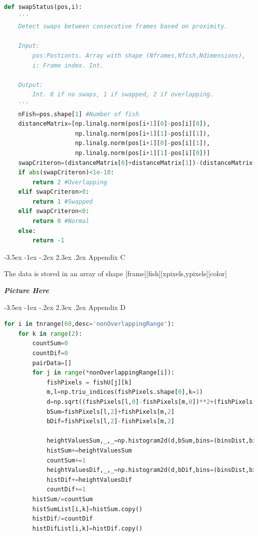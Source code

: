 \documentclass{article}
\makeatletter
\renewcommand\section{\clearpage\newpage\@startsection {section}{1}{\z@}%
	{-3.5ex \@plus -1ex \@minus -.2ex}%
	{2.3ex \@plus.2ex}%
	{\normalfont\Large\bfseries}}
\makeatother
\begin{document}
\begin{minipage}[c]{\textwidth}
\begin{lstlisting}[language=Python]
def swapStatus(pos,i):
    '''
    Detect swaps between consecutive frames based on proximity.
    
    Input:
        pos:Postionts. Array with shape (Nframes,Nfish,Ndimensions),
        i: Frame index. Int.
    
    Output:
        Int. 0 if no swaps, 1 if swapped, 2 if overlapping.
    '''
    nFish=pos.shape[1] #Number of fish
    distanceMatrix=[np.linalg.norm(pos[i+1][0]-pos[i][0]),
                    np.linalg.norm(pos[i+1][1]-pos[i][1]),
                    np.linalg.norm(pos[i+1][0]-pos[i][1]),
                    np.linalg.norm(pos[i+1][1]-pos[i][0])]
    swapCriteron=(distanceMatrix[0]+distanceMatrix[1])-(distanceMatrix[2]+distanceMatrix[3])
    if abs(swapCriteron)<1e-10:
        return 2 #Overlapping
    elif swapCriteron>0:
        return 1 #Swapped
    elif swapCriteron<0:
        return 0 #Normal
    else:
        return -1
\end{lstlisting}
\end{minipage}

\section{Appendix C}
\label{app:dataShape}

The data is stored in an array of shape [frame][fish][xpixels,ypixels][color]

\textit{\textbf{Picture Here}}

\section{Appendix D}
\label{app:histCreator}

\begin{minipage}[c]{\textwidth}
\begin{lstlisting}[language=Python]
for i in tnrange(60,desc='nonOverlappingRange'):
    for k in range(2):
        countSum=0
        countDif=0
        pairData=[]
        for j in range(*nonOverlappingRange[i]):
            fishPixels = fishU[j][k]
            m,l=np.triu_indices(fishPixels.shape[0],k=1)
            d=np.sqrt((fishPixels[l,0]-fishPixels[m,0])**2+(fishPixels[l,1]-fishPixels[m,1])**2)
            bSum=fishPixels[l,2]+fishPixels[m,2]
            bDif=fishPixels[l,2]-fishPixels[m,2]

            heightValuesSum,_,_=np.histogram2d(d,bSum,bins=(binsDist,binsSum))
            histSum+=heightValuesSum
            countSum+=1
            heightValuesDif,_,_=np.histogram2d(d,bDif,bins=(binsDist,binsDif))
            histDif+=heightValuesDif
            countDif+=1
        histSum/=countSum
        histSumList[i,k]=histSum.copy()
        histDif/=countDif
        histDifList[i,k]=histDif.copy()
\end{lstlisting}
\end{minipage}


%
%
\end{document}
